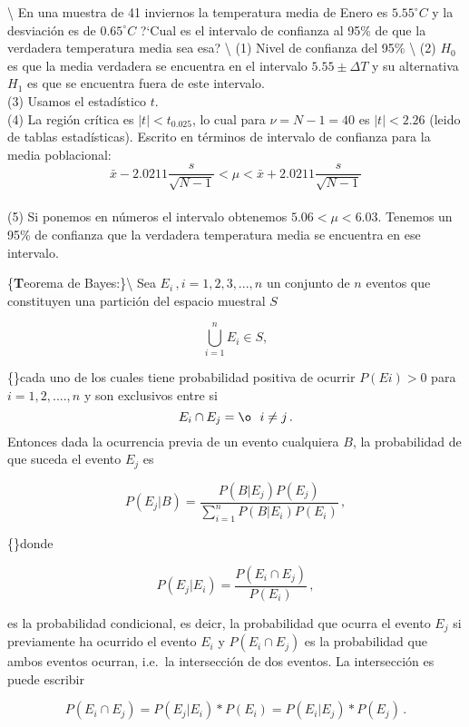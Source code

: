 \documentclass[
]{agujournal2019}
\begin{document}
\textbackslash{} En una muestra de 41
inviernos la temperatura media de Enero es \(5.55^\circ{C}\) y la
desviación es de \(0.65^\circ{C}\) ?{}`Cual es el intervalo de confianza
al 95\% de que la verdadera temperatura media sea esa? \textbackslash{}
(1) Nivel de confianza del 95\% \textbackslash{} (2) \(H_0\) es que la
media verdadera se encuentra en el intervalo \(5.55\pm \Delta{T}\) y su
alternativa \(H_1\) es que se encuentra fuera de este intervalo.\\
(3) Usamos el estadístico \(t\).\\
(4) La región crítica es \(|t|<t_{0.025}\), lo cual para \(\nu=N-1=40\)
es \(|t|<2.26\) (leido de tablas estadísticas). Escrito en términos de
intervalo de confianza para la media poblacional:
\[\bar{x}-2.0211\frac{s}{\sqrt{N-1}}<\mu<\bar{x}+2.0211\frac{s}{\sqrt{N-1}}  \]\\
(5) Si ponemos en números el intervalo obtenemos \(5.06<\mu<6.03\).
Tenemos un 95\% de confianza que la verdadera temperatura media se
encuentra en ese intervalo.

\vspace{0.5cm}

\{\noindent \textbf Teorema de Bayes:\}\textbackslash{} Sea
\(E_i\,,i=1,2,3,...,n\) un conjunto de \(n\) eventos que constituyen una
partición del espacio muestral \(S\)

\[\bigcup^n_{i=1}E_i\in S,\]

\{\noindent\}cada uno de los cuales tiene probabilidad positiva de
ocurrir \(P(Ei)>0\) para \(i=1,2,....,n\) y son exclusivos entre si
\[E_i\cap E_j=\o \,\,\,\,i\ne j\,.\] Entonces dada la ocurrencia previa
de un evento cualquiera \(B\), la probabilidad de que suceda el evento
\(E_j\) es

\begin{equation}
P(E_j|B)=\frac{P(B|E_j)P(E_j)}{\sum^n_{i=1}P(B|E_i)P(E_i)}\,,
\end{equation}

\{\noindent\}donde

\[P(E_j|E_i)=\frac{P(E_i\cap E_j)}{P(E_i)}\,,\]

es la probabilidad condicional, es deicr, la probabilidad que ocurra el
evento \(E_j\) si previamente ha ocurrido el evento \(E_i\) y
\(P(E_i \cap E_j)\) es la probabilidad que ambos eventos ocurran,
i.e.~la intersección de dos eventos. La intersección es puede escribir

\[P(E_i\cap E_j)=P(E_j|E_i)*P(E_i)=P(E_i|E_j)*P(E_j)\,.\]
\end{document}
